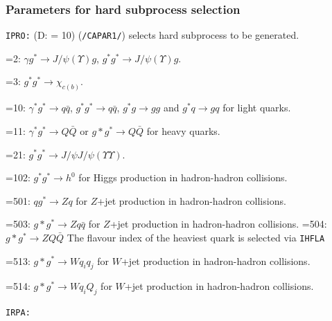 \documentclass[11pt]{article} \usepackage{mystyle-new}
\newcommand{\deflab}[1]{#1\hfil}%
\newenvironment{defl}[1]%
  {\begin{list}{}{\settowidth{\labelwidth}{#1}%
  \setlength{\leftmargin}{\labelwidth}%
  \addtolength{\leftmargin}{\labelsep}%
  \setlength{\itemsep}{0pt plus 1pt}
  \setlength{\parsep}{0pt plus 1pt}
  \setlength{\topsep}{0pt plus 1pt}
  \setlength{\partopsep}{0pt plus 1pt}
  \setlength{\parskip}{2mm plus 1mm minus 1mm}
  \let\makelabel\deflab}}%
  {\end{list}}
\begin{document}
\subsubsection{Parameters for hard subprocess selection}
\begin{defl}{123456789012345}
\item[{\tt IPRO:}]  (D: = 10) ({\tt /CAPAR1/})
                    selects hard subprocess to be generated. 
\item[{\it         }]
                 =2:   $\gamma g^* \rightarrow J/\psi (\Upsilon) g$, $g^* g^* \rightarrow J/\psi (\Upsilon) g$.
\item[{\it         }]
                 =3:   $g^* g^* \rightarrow \chi_{c(b)}$.
\item[{\it         }]
                 =10:   $\gamma^* g^* \rightarrow q \bar{q}$,
		            $g^* g^* \rightarrow q \bar{q}$,
                        $g^* g \to gg $ and 
                        $g^* q \to gq$ 
                        for light quarks.
\item[{\it         }]
                 =11:   $\gamma^* g^* \rightarrow Q \bar{Q}$ or 
		            $g* g^* \rightarrow Q \bar{Q}$
                        for heavy quarks.
\item[{\it         }]
                 =21:   $g^* g^* \rightarrow J/\psi J/\psi  (\Upsilon \Upsilon)$.
\item[{\it         }]
                 =102:   $g^* g^* \rightarrow h^0$
                        for Higgs production in hadron-hadron collisions.
\item[{\it         }]
                 =501:   
                 $q g^* \rightarrow Z q$
                        for $Z$+jet production in hadron-hadron collisions.
 \item[{\it         }]
                 =503:   $g* g^* \rightarrow Z q\bar{q}$
                        for $Z$+jet production in hadron-hadron collisions. 
                 =504:   $g* g^* \rightarrow Z Q\bar{Q}$
                         The flavour index of the heaviest quark is selected via  \verb+IHFLA+
 \item[{\it         }]
                 =513:   $g* g^* \rightarrow W q_i q_j$
                        for $W$+jet production in hadron-hadron collisions. 
 \item[{\it         }]
                 =514:   $g* g^* \rightarrow W q_i Q_j$
                        for $W$+jet production in hadron-hadron collisions. 
\item[{\tt IRPA:}]  

\end{defl}
\end{document}

